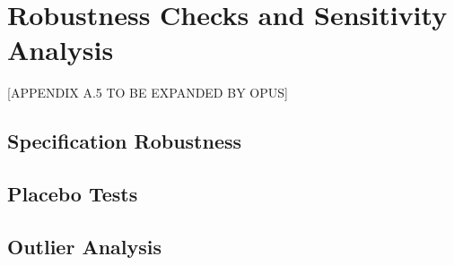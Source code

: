 \section{Robustness Checks and Sensitivity Analysis}
\label{sec:A5}

[APPENDIX A.5 TO BE EXPANDED BY OPUS]

\subsection{Specification Robustness}

\subsection{Placebo Tests}

\subsection{Outlier Analysis}
